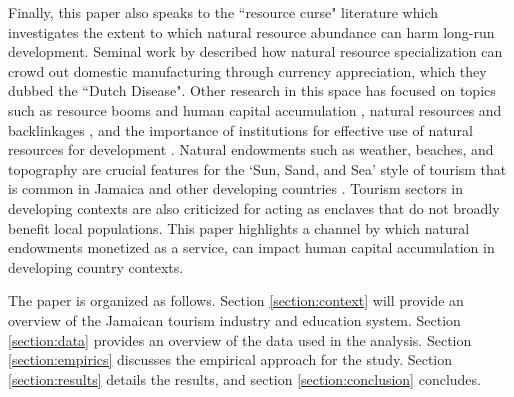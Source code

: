 \documentclass[12pt]{article}
\begin{document}
	Finally, this paper also speaks to the ``resource curse" literature which investigates the extent to which natural resource abundance can harm long-run development. Seminal work by \textcite{ corden_booming_1982} described how natural resource specialization can crowd out domestic manufacturing through currency appreciation, which they dubbed the ``Dutch Disease". Other research in this space has focused on topics such as resource booms and human capital accumulation \parencite{ bonilla_mejia_mining_2020}, natural resources and backlinkages \parencite{ aragon_natural_2013}, and the importance of institutions for effective use of natural resources for development \parencite{ venables_using_2016}. Natural endowments such as weather, beaches, and topography are crucial features for the `Sun, Sand, and Sea' style of tourism that is common in Jamaica and other developing countries \parencite{ faber_tourism_2019, king_evolution_2001}. Tourism sectors in developing contexts are also criticized for acting as enclaves that do not broadly benefit local populations. This paper highlights a channel by which natural endowments monetized as a service, can impact human capital accumulation in developing country contexts. 
	
	
	The paper is organized as follows. Section \ref{section:context} will provide an overview of the Jamaican tourism industry and education system. Section \ref{section:data} provides an overview of the data used in the analysis. Section \ref{section:empirics} discusses the empirical approach for the study. Section \ref{section:results} details the results, and section \ref{section:conclusion} concludes.  
	
	 
 
\end{document}

